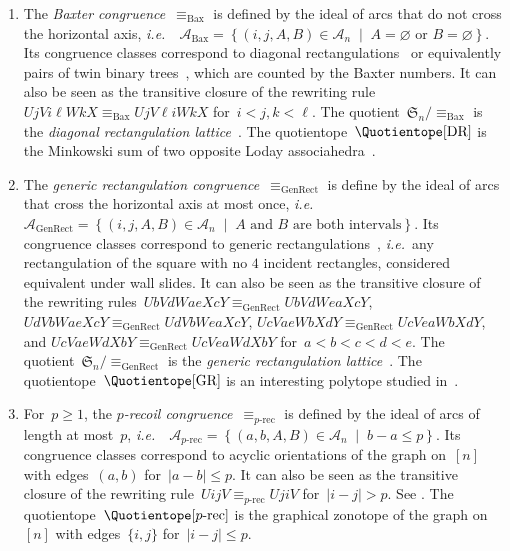 \documentclass{amsart}
\theoremstyle{definition}
\newcommand{\f}[1]{{\mathfrak{#1}}} %
\newcommand{\set}[2]{\left\{ #1 \;\middle|\; #2 \right\}} %
\newcommand{\ie}{\textit{i.e.}~} %
\newcommand{\darkblue}{\color{darkblue}} %
\newcommand{\defn}[1]{\textsl{\darkblue #1}} %
\newcommand{\arcs}{{\mathcal{A}}} %
\begin{document}
\begin{enumerate}
\item \label{item:BaxterCongruence}
The \defn{Baxter congruence}~$\equiv_\textrm{Bax}$ is defined by the ideal of arcs that do not cross the horizontal axis, \ie~$\arcs_\textrm{Bax} = \set{(i, j, A, B) \in \arcs_n}{A = \varnothing \text{ or } B = \varnothing}$.
Its congruence classes correspond to diagonal rectangulations~\cite{LawReading} or equivalently pairs of twin binary trees~\cite{Giraudo}, which are counted by the Baxter numbers.
It can also be seen as the transitive closure of the rewriting rule~$U j V i \ell W k X \equiv_{\textrm{Bax}} U j V \ell i W k X$ for~$i < j, k < \ell$.
The quotient~$\f{S}_n / {\equiv_\textrm{Bax}}$ is the \defn{diagonal rectangulation lattice}~\cite{LawReading}.
The quotientope~$\Quotientope[\textrm{DR}]$ is the Minkowski sum of two opposite Loday associahedra~\cite{LawReading}.

\item \label{item:GenericRectangulationCongruence}
The \defn{generic rectangulation congruence}~$\equiv_\textrm{GenRect}$ is define by the ideal of arcs that cross the horizontal axis at most once, \ie~$\arcs_\textrm{GenRect} = \set{(i, j, A, B) \in \arcs_n}{A \text{ and } B \text{ are both intervals}}$.
Its congruence classes correspond to generic rectangulations~\cite{Reading-rectangulations}, \ie any rectangulation of the square with no $4$ incident rectangles, considered equivalent under wall slides.
It can also be seen as the transitive closure of the rewriting rules~$UbVdWaeXcY \equiv_\textrm{GenRect} UbVdWeaXcY$, $UdVbWaeXcY \equiv_\textrm{GenRect} UdVbWeaXcY$, $UcVaeWbXdY \equiv_\textrm{GenRect} UcVeaWbXdY$, and $UcVaeWdXbY \equiv_\textrm{GenRect} UcVeaWdXbY$ for~$a < b < c < d < e$.
The quotient~$\f{S}_n / {\equiv_\textrm{GenRect}}$ is the \defn{generic rectangulation lattice}~\cite{Reading-rectangulations}.
The quotientope~$\Quotientope[\textrm{GR}]$  is an interesting polytope studied in~\cite{CardinalPilaud}.

\item 
For~$p \ge 1$, the \defn{$p$-recoil congruence}~$\equiv_{p\textrm{-rec}}$ is defined by the ideal of arcs of length at most~$p$, \ie~$\arcs_{p\textrm{-rec}} = \set{(a, b, A, B) \in \arcs_n}{b-a \le p}$.
Its congruence classes correspond to acyclic orientations of the graph on~$[n]$ with edges~$(a,b)$ for~$|a-b| \le p$.
It can also be seen as the transitive closure of the rewriting rule~$U i j V \equiv_{p\textrm{-rec}} U j i V$ for~$|i - j| > p$. See \cite{Reading-HopfAlgebras, Pilaud-brickAlgebra}.
The quotientope~$\Quotientope[p\textrm{-rec}]$ is the graphical zonotope of the graph on~$[n]$ with edges~$\{i,j\}$ for~$|i-j| \le p$.


\end{enumerate}
\end{document}

